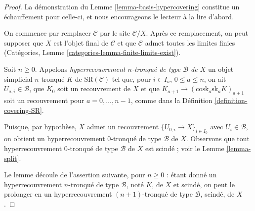 \begin{proof}
La démonstration du Lemme \ref{lemma-basis-hypercovering}
constitue un échauffement pour celle-ci, et
nous encourageons le lecteur à la lire d'abord.

\medskip\noindent
On commence par remplacer $\mathcal{C}$ par le site $\mathcal{C}/X$.
Après ce remplacement, on peut supposer que $X$ est l'objet final
de $\mathcal{C}$ et que $\mathcal{C}$ admet toutes les limites finies
(Catégories, Lemme \ref{categories-lemma-finite-limits-exist}).

\medskip\noindent
Soit $n \geq 0$. Appelons
{\it hyperrecouvrement $n$-tronqué de type $\mathcal{B}$ de $X$}
un objet simplicial $n$-tronqué $K$
de $\text{SR}(\mathcal{C})$
tel que, pour $i \in I_a$, $0 \leq a \leq n$,
on ait $U_{a, i} \in \mathcal{B}$, que
$K_0$ soit un recouvrement de $X$ et que
$K_{a + 1} \to (\text{cosk}_a \text{sk}_a K)_{a + 1}$
soit un recouvrement pour $a = 0, \ldots, n - 1$,
comme dans la Définition \ref{definition-covering-SR}.

\medskip\noindent
Puisque, par hypothèse, $X$ admet un recouvrement $\{U_{0, i} \to X\}_{i \in I_0}$
avec $U_i \in \mathcal{B}$, on obtient un hyperrecouvrement
$0$-tronqué de type $\mathcal{B}$ de $X$. Observons que tout hyperrecouvrement
$0$-tronqué de type $\mathcal{B}$ de $X$ est scindé ; voir le
Lemme \ref{lemma-split}.

\medskip\noindent
Le lemme découle de l'assertion suivante, pour $n \geq 0$ : étant donné un
hyperrecouvrement $n$-tronqué de type $\mathcal{B}$, noté $K$, de $X$ et scindé,
on peut le prolonger en un
hyperrecouvrement $(n + 1)$-tronqué de type $\mathcal{B}$, scindé, de $X$.


\end{proof}
